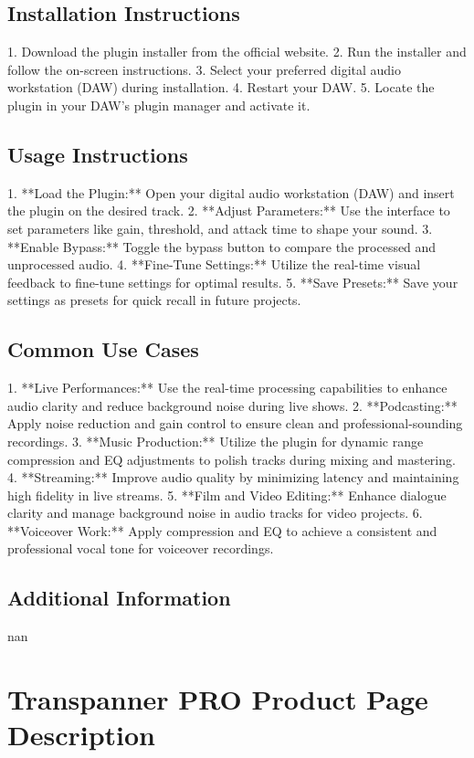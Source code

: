 \documentclass[8pt]{article}
\begin{document}
    \subsection*{Installation Instructions}
    1. Download the plugin installer from the official website.
2. Run the installer and follow the on-screen instructions.
3. Select your preferred digital audio workstation (DAW) during installation.
4. Restart your DAW.
5. Locate the plugin in your DAW’s plugin manager and activate it.

    \subsection*{Usage Instructions}
    1. **Load the Plugin:** Open your digital audio workstation (DAW) and insert the plugin on the desired track.
2. **Adjust Parameters:** Use the interface to set parameters like gain, threshold, and attack time to shape your sound.
3. **Enable Bypass:** Toggle the bypass button to compare the processed and unprocessed audio.
4. **Fine-Tune Settings:** Utilize the real-time visual feedback to fine-tune settings for optimal results.
5. **Save Presets:** Save your settings as presets for quick recall in future projects.

    \subsection*{Common Use Cases}
    1. **Live Performances:** Use the real-time processing capabilities to enhance audio clarity and reduce background noise during live shows.
2. **Podcasting:** Apply noise reduction and gain control to ensure clean and professional-sounding recordings.
3. **Music Production:** Utilize the plugin for dynamic range compression and EQ adjustments to polish tracks during mixing and mastering.
4. **Streaming:** Improve audio quality by minimizing latency and maintaining high fidelity in live streams.
5. **Film and Video Editing:** Enhance dialogue clarity and manage background noise in audio tracks for video projects.
6. **Voiceover Work:** Apply compression and EQ to achieve a consistent and professional vocal tone for voiceover recordings.

    \subsection*{Additional Information}
    nan
    

    \section*{Transpanner PRO  Product Page Description}
\end{document}
